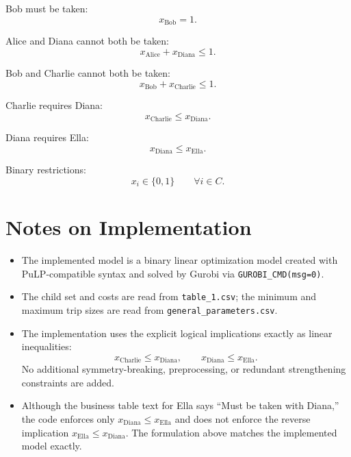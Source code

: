 Bob must be taken:
\[
x_{\text{Bob}} = 1.
\]

Alice and Diana cannot both be taken:
\[
x_{\text{Alice}} + x_{\text{Diana}} \le 1.
\]

Bob and Charlie cannot both be taken:
\[
x_{\text{Bob}} + x_{\text{Charlie}} \le 1.
\]

Charlie requires Diana:
\[
x_{\text{Charlie}} \le x_{\text{Diana}}.
\]

Diana requires Ella:
\[
x_{\text{Diana}} \le x_{\text{Ella}}.
\]

Binary restrictions:
\[
x_i \in \{0,1\} \qquad \forall i \in C.
\]

\section*{Notes on Implementation}

\begin{itemize}
    \item The implemented model is a binary linear optimization model created with PuLP-compatible syntax and solved by Gurobi via \texttt{GUROBI\_CMD(msg=0)}.
    \item The child set and costs are read from \texttt{table\_1.csv}; the minimum and maximum trip sizes are read from \texttt{general\_parameters.csv}.
    \item The implementation uses the explicit logical implications exactly as linear inequalities:
    \[
    x_{\text{Charlie}} \le x_{\text{Diana}}, \qquad
    x_{\text{Diana}} \le x_{\text{Ella}}.
    \]
    No additional symmetry-breaking, preprocessing, or redundant strengthening constraints are added.
    \item Although the business table text for Ella says ``Must be taken with Diana,'' the code enforces only $x_{\text{Diana}} \le x_{\text{Ella}}$ and does not enforce the reverse implication $x_{\text{Ella}} \le x_{\text{Diana}}$. The formulation above matches the implemented model exactly.
\end{itemize}
